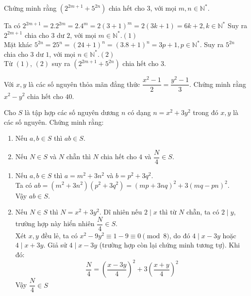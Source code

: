 \begin{ex}

 Chứng minh rằng $\left( 2^{2m+1}+5^{2n} \right)$ chia hết cho $3$, với mọi $m,n\in \mathbb{N}^*$.

	\loigiai
	{
	  Ta có $2^{2m + 1} = 2.2^{2m} = 2.4^m = 2(3 + 1)^m = 2(3k + 1) = 6k + 2,k \in \mathbb{N}^*$
			Suy ra $2^{2m + 1}$ chia cho $3$ dư $2$, với mọi $m \in \mathbb{N}^*$.\hfill$(1)$\\
			Mặt khác $5^{2n} = 25^n = (24 + 1)^n = (3.8 + 1)^n = 3p + 1,p \in \mathbb{N}^*$.
			Suy ra $5^{2n}$ chia cho $3$ dư $1$,  với mọi $n \in \mathbb{N}^*$.\hfill$(2)$\\
			Từ $(1)$, $(2)$ suy ra $\left( 2^{2m + 1} + 5^{2n} \right)$ chia hết cho $3$.
	}
\end{ex}
\begin{ex}
	 Với $x,y$ là các số nguyên  thỏa mãn đẳng thức $\dfrac{x^2-1}{2} = \dfrac{y^2-1}{3}$. Chứng minh rằng $x^2-y^2$ chia hết cho $40$.
		
\end{ex}
\begin{ex}
	Cho $S$ là tập hợp các số nguyên dương $n$ có dạng $n=x^2+3y^2$ trong đó $x,y$ là các số nguyên. Chứng minh rằng:
	\begin{enumerate}
		\item Nếu $a,b \in S$ thì $ab \in S$.
		\item Nếu $N \in S$ và $N$ chẵn thì $N$ chia hết cho $4$ và $\dfrac{N}{4} \in S$.
	\end{enumerate}
	\loigiai
	{
		\begin{enumerate}
			\item Nếu $a,b\in S$ thì $a=m^2+3n^2$ và $b=p^2+3q^2$. \\
			Ta có  $ab=(m^2+3n^2)(p^{2} + 3q^{2}) = (mp + 3nq)^{2} + 3(mq - pn)^{2}$.\\
			Vậy $ab\in S$.
			\item Nếu $N\in S$ thì $N = x^{2} + 3y^{2}$. Dĩ nhiên nếu $2\mid x$ thì từ $N$ chẵn, ta có $2\mid y$, trường hợp này hiển nhiên $\dfrac{N}{4} \in {S}$.\\
			Xét $x, y$ đều lẻ, ta có $x^{2} - 9y^{2} \equiv 1 - 9 \equiv 0\pmod{8}$, do đó $4\mid x - 3y$ hoặc $4\mid x + 3y$. Giả sử $4\mid x - 3y$ (trường hợp còn lại chứng minh tương tự).
			Khi đó: $$\dfrac{N}{4} = \left(\dfrac{x - 3y}{4}\right)^{2} + 3\left(\dfrac{x + y}{4}\right)^{2}$$
			Vậy $\dfrac{N}{4}\in S$
		\end{enumerate}
	}
\end{ex}
